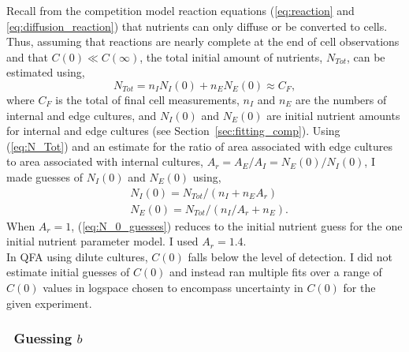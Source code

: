 Recall from the competition model reaction equations
(\ref{eq:reaction} and \ref{eq:diffusion_reaction}) that nutrients can
only diffuse or be converted to cells. Thus, assuming that reactions
are nearly complete at the end of cell observations and that
\(C(0) \ll C(\infty)\), the total initial amount of nutrients,
\(N_{Tot}\), can be estimated using,
\begin{equation}
  \label{eq:N_Tot}
  N_{Tot} = n_{I}N_{I}(0) + n_{E}N_{E}(0) \approx C_{F},
\end{equation}
where \(C_{F}\) is the total of final cell measurements, \(n_{I}\) and
\(n_{E}\) are the numbers of internal and edge cultures, and
\(N_{I}(0)\) and \(N_{E}(0)\) are initial nutrient amounts
for internal and edge cultures (see
Section~\ref{sec:fitting_comp}). Using (\ref{eq:N_Tot}) and an estimate
for the ratio of area associated with edge cultures to area associated
with internal cultures,
\(A_{r} = A_{E} / A_{I} = N_{E}(0) / N_{I}(0)\), I made
guesses of \(N_{I}(0)\) and \(N_{E}(0)\) using,
%
\begin{equation}
  \label{eq:N_0_guesses}
  \begin{aligned}
    &N_{I}(0) = N_{Tot} / (n_{I} + n_{E}A_{r})\\
    &N_{E}(0) = N_{Tot} / (n_{I}/A_{r} + n_{E}).
  \end{aligned}
\end{equation}
%
When \(A_{r} = 1\), (\ref{eq:N_0_guesses}) reduces to the initial
nutrient guess for the one initial nutrient parameter model. I used
\(A_{r} = 1.4\).
\\
In QFA using dilute cultures, \(C(0)\) falls below the level of
detection. I did not estimate initial guesses of \(C(0)\) and instead
ran multiple fits over a range of \(C(0)\) values in logspace chosen
to encompass uncertainty in \(C(0)\) for the given experiment.



\subsubsection{\boldmath \thesubsubsection~Guessing \(b\) \unboldmath}
\label{sec:guessing_b}

